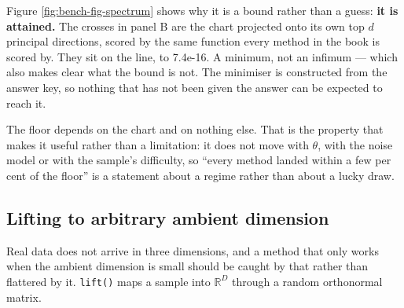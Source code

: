 \documentclass[
  british,
  a4paper,
]{book}
\newenvironment{Shaded}{\begin{snugshade}}{\end{snugshade}}
\newcommand{\AttributeTok}[1]{\textcolor[rgb]{0.13,0.29,0.53}{#1}}
\newcommand{\DataTypeTok}[1]{\textcolor[rgb]{0.13,0.29,0.53}{#1}}
\newcommand{\DecValTok}[1]{\textcolor[rgb]{0.00,0.00,0.81}{#1}}
\newcommand{\FunctionTok}[1]{\textcolor[rgb]{0.13,0.29,0.53}{\textbf{#1}}}
\newcommand{\NormalTok}[1]{#1}
\newcommand{\OtherTok}[1]{\textcolor[rgb]{0.56,0.35,0.01}{#1}}
\newcommand{\SpecialCharTok}[1]{\textcolor[rgb]{0.81,0.36,0.00}{\textbf{#1}}}
\newcommand{\StringTok}[1]{\textcolor[rgb]{0.31,0.60,0.02}{#1}}
\begin{document}
Figure \ref{fig:bench-fig-spectrum} shows why it is a bound rather than a
guess: \textbf{it is attained.} The crosses in panel B are the chart projected onto
its own top \(d\) principal directions, scored by the same function every method
in the book is scored by. They sit on the line, to
7.4e-16. A minimum, not an infimum --- which also
makes clear what the bound is not. The minimiser is constructed from the answer
key, so nothing that has not been given the answer can be expected to reach it.

The floor depends on the chart and on nothing else. That is the property that
makes it useful rather than a limitation: it does not move with \(\theta\), with
the noise model or with the sample's difficulty, so ``every method landed within
a few per cent of the floor'' is a statement about a regime rather than about a
lucky draw.

\subsection{Lifting to arbitrary ambient dimension}\label{lifting-to-arbitrary-ambient-dimension}

Real data does not arrive in three dimensions, and a method that only works when
the ambient dimension is small should be caught by that rather than flattered by
it. \texttt{lift()} maps a sample into \(\mathbb{R}^D\) through a random orthonormal
matrix.

\begin{Shaded}
\end{Shaded}
\end{document}
